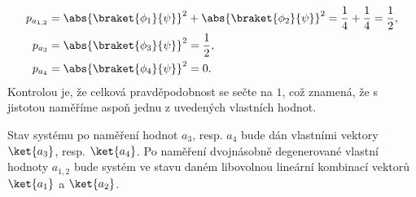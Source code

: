 \begin{solution}
\begin{enumerate}
        \begin{subequations}
            \begin{align}
                p_{a_{1,2}}
                    &=\abs{\braket{\phi_{1}}{\psi}}^{2}+\abs{\braket{\phi_{2}}{\psi}}^{2}
                    =\frac{1}{4}+\frac{1}{4}=\frac{1}{2},\\
                p_{a_{3}}
                    &=\abs{\braket{\phi_{3}}{\psi}}^{2}=\frac{1}{2},\\
                p_{a_{4}}
                    &=\abs{\braket{\phi_{4}}{\psi}}^{2}=0.
            \end{align}
        \end{subequations}
        Kontrolou je, že celková pravděpodobnost se sečte na $1$, což znamená, že s jistotou naměříme aspoň jednu z uvedených vlastních hodnot.
		
		Stav systému po naměření hodnot $a_{3}$, resp. $a_{4}$ bude dán vlastními vektory $\ket{a_{3}}$, resp. $\ket{a_{4}}$.
        Po naměření dvojnásobně degenerované vlastní hodnoty $a_{1,2}$ bude systém ve stavu daném libovolnou lineární kombinací vektorů $\ket{a_{1}}$ a $\ket{a_{2}}$.		
        

\end{enumerate}
\end{solution}
